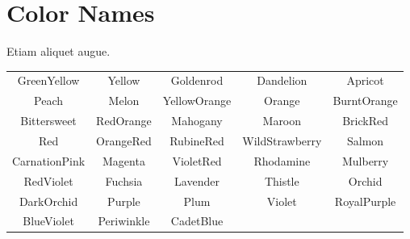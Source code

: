 


\section{\color{Red}Color Names}



Etiam aliquet augue. 



\begin{center}
  \begin{tabular}{ccccc}
		{\color{GreenYellow}GreenYellow}       & 
		{\color{Yellow}Yellow}                 & 
		{\color{Goldenrod}Goldenrod}           & 
		{\color{Dandelion}Dandelion}           & 
		{\color{Apricot}Apricot}               \\
		{\color{Peach}Peach}                   & 
		{\color{Melon}Melon}                   &
		{\color{YellowOrange}YellowOrange}     &
		{\color{Orange}Orange}                 &
		{\color{BurntOrange}BurntOrange}       \\
		{\color{Bittersweet}Bittersweet}       &
		{\color{RedOrange}RedOrange}           &
		{\color{Mahogany}Mahogany}             &
		{\color{Maroon}Maroon}                 &
		{\color{BrickRed}BrickRed}             \\
		{\color{Red}Red}                       &
		{\color{OrangeRed}OrangeRed}           &
		{\color{RubineRed}RubineRed}           &
		{\color{WildStrawberry}WildStrawberry} &
		{\color{Salmon}Salmon}                 \\
		{\color{CarnationPink}CarnationPink}   &
		{\color{Magenta}Magenta}               &
		{\color{VioletRed}VioletRed}           &
		{\color{Rhodamine}Rhodamine}           &
		{\color{Mulberry}Mulberry}             \\
		{\color{RedViolet}RedViolet}           &
		{\color{Fuchsia}Fuchsia}               &
		{\color{Lavender}Lavender}             &
		{\color{Thistle}Thistle}               &
		{\color{Orchid}Orchid}                 \\ 
		{\color{DarkOrchid}DarkOrchid}         &
		{\color{Purple}Purple}                 &
		{\color{Plum}Plum}                     &
		{\color{Violet}Violet}                 &
		{\color{RoyalPurple}RoyalPurple}       \\
		{\color{BlueViolet}BlueViolet}         &
		{\color{Periwinkle}Periwinkle}         &
		{\color{CadetBlue}CadetBlue}           &

\end{tabular}
\end{center}
